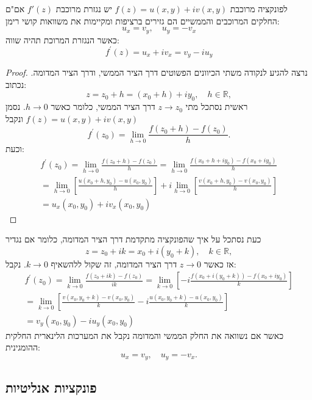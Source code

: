 \documentclass{tstextbook}
\begin{document}
\begin{theorem}
לפונקציה מרוכבת \(f(z)=u(x,y)+iv(x,y)\) יש נגזרת מרוכבת \(f'(z)\) אם"ם החלקים המרוכבים והממשיים הם גזירים ברציפות ומקיימות את משוואות קושי רימן:
$$u_{x}=v_{y},\quad u_{y}=-v_{x}$$
כאשר הנגזרת המרוכת תהיה שווה:
$$f^{\prime}(z)=u_{x}+i v_{x}=v_{y}-i u_{y}$$

\end{theorem}
\begin{proof}
נרצה להגיע לנקודה משתי הכיוונים הפשוטים דרך הציר הממשי, ודרך הציר המדומה. נכתוב:
$$z=z_{0}+h=(x_{0}+h)+i y_{0},\quad h\in\mathbb{R},$$
ראשית נסתכל מתי \(z\to z_{0}\) דרך הציר הממשי, כלומר כאשר \(h\to 0\).
נסמן \(f(z)=u(x,y)+iv(x,y)\) ונקבל $$f^{\prime}(z_{0})=\operatorname*{lim}_{h\to0}{\frac{f(z_{0}+h)-f(z_{0})}{h}}.$$
וכעת:
$$\begin{gather}{f^{\prime}(z_{0})=\operatorname*{lim}_{h\to0}{\frac{f(z_{0}+h)-f(z_{0})}{h}}=\operatorname*{lim}_{h\to0}{\frac{f(x_{0}+h+i y_{0})-f(x_{0}+i y_{0})}{h}}}\\ {=\operatorname*{lim}_{h\to0}\left[{\frac{u\left(x_{0}+h,y_{0}\right)-u\left(x_{0},y_{0}\right)}{h}}\right]+i\operatorname*{lim}_{h\to0}\left[{\frac{v\left(x_{0}+h,y_{0}\right)-v\left(x_{0},y_{0}\right)}{h}}\right]}\\ {=u_{x}(x_{0},y_{0})+i v_{x}(x_{0},y_{0})}\end{gather}$$

\end{proof}
כעת נסתכל על איך שהפונקציה מתקדמת דרך הציר המדומה, כלומר אם נגדיר
$$z=z_{0}+i k=x_{0}+i(y_{0}+k),\quad k\in\mathbb{R},$$
אז כאשר \(z\to 0\) דרך הציר המדומה, זה שקול ללהשאיף \(k\to 0\). נקבל:
$$\begin{gather}{f^{\prime}(z_{0})=\operatorname*{lim}_{k\to0}{\frac{f(z_{0}+i k)-f(z_{0})}{i k}}=\operatorname*{lim}_{k\to0}\left[-i{\frac{f(x_{0}+i(y_{0}+k))-f(x_{0}+i y_{0})}{k}}\right]}\\ {=\operatorname*{lim}_{k\to0}\left[{\frac{v\left(x_{0},y_{0}+k\right)-v\left(x_{0},y_{0}\right)}{k}}-i{\frac{u\left(x_{0},y_{0}+k\right)-u\left(x_{0},y_{0}\right)}{k}}\right]}\\ {=v_{y}(x_{0},y_{0})-i u_{y}(x_{0},y_{0})}\end{gather}$$
כאשר אם נשוואה את החלק הממשי והמדומה נקבל את המערכות הלינארית החלקית ההומגינית:
$$u_{x}=v_{y},\quad u_{y}=-v_{x}.$$

\subsection{פונקציות אנליטיות}
\end{document}
